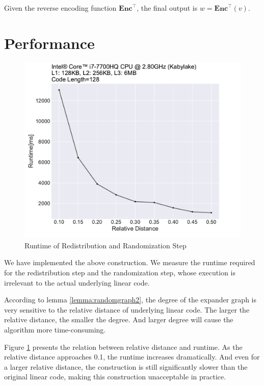 Given the reverse encoding function $\textbf{Enc}^{\top}$, the final output is $w = \textbf{Enc}^{\top}(v)$.

\section{Performance}

\begin{figure}[h]
    \centering
    \includegraphics[width=1\textwidth]{graph/degree.pdf}
    \caption{Runtime of Redistribution and Randomization Step}
    \label{fig:degree}
\end{figure}


We have implemented the above construction. We measure the runtime required for the redistribution step and the randomization step, whose execution is irrelevant to the actual underlying linear code.


According to lemma \ref{lemma:randomgraph2}, the degree of the expander graph is very sensitive to the relative distance of underlying linear code. The larger the relative distance, the smaller the degree. And larger degree will cause the algorithm more time-consuming.

Figure \ref{fig:degree} presents the relation between relative distance and runtime. As the relative distance approaches 0.1, the runtime increases dramatically. And even for a larger relative distance, the construction is still significantly slower than the original linear code, making this construction unacceptable in practice.

